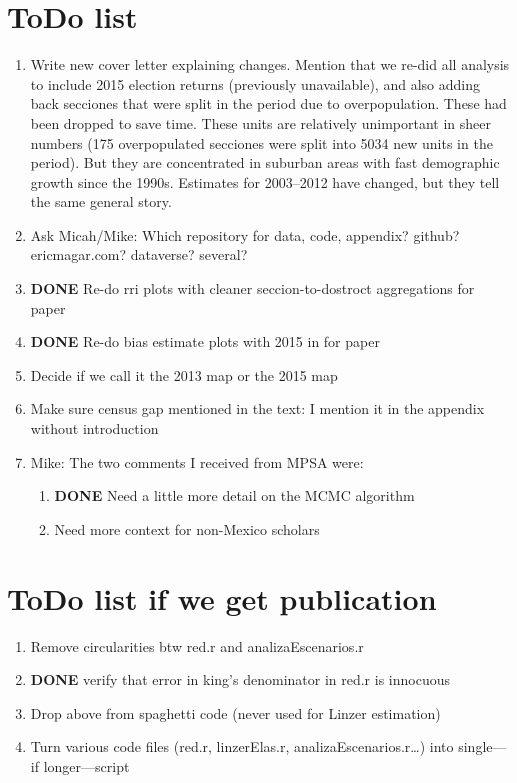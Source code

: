 \documentclass{article}
\begin{document}
\section{ToDo list}
\label{sec:orgheadline41}
\begin{enumerate}
\item Write new cover letter explaining changes. Mention that we re-did all analysis to include 2015 election returns (previously unavailable), and also adding back secciones that were split in the period due to overpopulation. These had been dropped to save time. These units are relatively unimportant in sheer numbers (175 overpopulated secciones were split into 5034 new units in the period). But they are concentrated in suburban areas with fast demographic growth since the 1990s. Estimates for 2003--2012 have changed, but they tell the same general story.
\label{sec:orgheadline32}
\item Ask Micah/Mike: Which repository for data, code, appendix? github? ericmagar.com? dataverse? several?
\label{sec:orgheadline33}
\item {\bfseries\sffamily DONE} Re-do rri plots with cleaner seccion-to-dostroct aggregations for paper
\label{sec:orgheadline34}
\item {\bfseries\sffamily DONE} Re-do bias estimate plots with 2015 in for paper
\label{sec:orgheadline35}
\item Decide if we call it the 2013 map or the 2015 map
\label{sec:orgheadline36}
\item Make sure census gap mentioned in the text: I mention it in the appendix without introduction
\label{sec:orgheadline37}
\item Mike: The two comments I received from MPSA were:
\label{sec:orgheadline40}
\begin{enumerate}
\item {\bfseries\sffamily DONE} Need a little more detail on the MCMC algorithm
\label{sec:orgheadline38}
\item Need more context for non-Mexico scholars
\label{sec:orgheadline39}
\end{enumerate}
\end{enumerate}

\section{ToDo list if we get publication}
\label{sec:orgheadline46}
\begin{enumerate}
\item Remove circularities btw red.r and analizaEscenarios.r
\label{sec:orgheadline42}
\item {\bfseries\sffamily DONE} verify that error in king's denominator in red.r is innocuous
\label{sec:orgheadline43}
\item Drop above from spaghetti code (never used for Linzer estimation)
\label{sec:orgheadline44}

\item Turn various code files (red.r, linzerElas.r, analizaEscenarios.r\ldots{}) into single---if longer---script
\label{sec:orgheadline45}
\end{enumerate}
\end{document}
